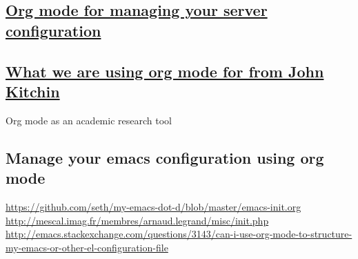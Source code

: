 \documentclass[11pt]{article}
\begin{document}
\subsection{\href{http://www.howardism.org/Technical/Emacs/literate-devops.html}{Org mode for managing your server configuration}}
\label{sec:orgheadline57}
\subsection{\href{http://kitchingroup.cheme.cmu.edu/blog/2014/08/08/What-we-are-using-org-mode-for/}{What we are using org mode for from John Kitchin}}
\label{sec:orgheadline58}
Org mode as an academic research tool
\subsection{Manage your emacs configuration using org mode}
\label{sec:orgheadline59}
\url{https://github.com/seth/my-emacs-dot-d/blob/master/emacs-init.org}
\url{http://mescal.imag.fr/membres/arnaud.legrand/misc/init.php}
\url{http://emacs.stackexchange.com/questions/3143/can-i-use-org-mode-to-structure-my-emacs-or-other-el-configuration-file}
\end{document}
